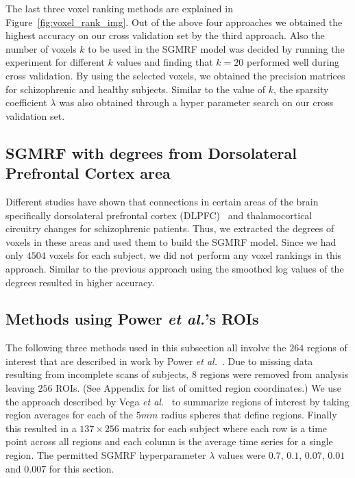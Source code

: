 \documentclass{article} %
\begin{document}
The last three voxel ranking methods are explained in Figure~\ref{fig:voxel_rank_img}. 
Out of the above four approaches we obtained the highest accuracy on our cross 
validation set by the third approach. Also the number of voxels $k$ to be used 
in the SGMRF model was decided by running the experiment for different $k$ 
values and finding that $k = 20$ performed well during cross validation. By using the selected voxels, we obtained the precision matrices for schizophrenic and healthy subjects. Similar to the value of $k$, the sparsity coefficient 
$\lambda$ was also obtained through a hyper parameter search on our cross 
validation set.


\subsection{SGMRF with degrees from Dorsolateral Prefrontal Cortex area}
Different studies have shown that connections in certain areas of the brain specifically dorsolateral 
prefrontal cortex (DLPFC)~\cite{Potkin2008} and 
thalamocortical~\cite{Cheng2015} circuitry changes for schizophrenic patients. Thus, we extracted the degrees 
of voxels in these areas and used them to build the SGMRF model. Since we 
had only $4504$ voxels for each subject, we did not perform any voxel 
rankings in this approach. Similar to the previous approach using the 
smoothed log values of the degrees resulted in higher accuracy.

\subsection{Methods using Power \emph{et al.}'s ROIs}

The following three methods used in this subsection all involve the $264$  
regions of interest that are described in work by Power \emph{et al.}~\cite{Power_2011}.
Due to missing data resulting from incomplete scans of subjects, $8$
regions were removed from analysis leaving $256$ ROIs. (See Appendix for
list of omitted region coordinates.) We use the
approach described by Vega \emph{et al.}~\cite{rvega} to summarize
regions of interest by taking region averages for each of the $5mm$ radius
spheres that define regions. Finally this resulted in a $137 \times 256$ matrix
for each subject where each row is a time point across all regions and each
column is the average time series for a single region. The permitted SGMRF 
hyperparameter $\lambda$ values were $0.7$, $0.1$, $0.07$, $0.01$ and 
$0.007$ for this section.
\end{document}
